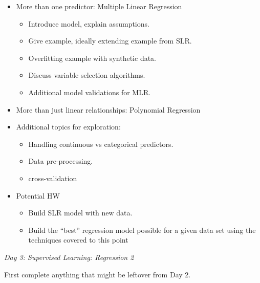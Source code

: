 \documentclass[12pt]{article}
\begin{document}
	\begin{itemize}
		\item More than one predictor: Multiple Linear Regression
		\begin{itemize}
			\item Introduce model, explain assumptions.
			\item Give example, ideally extending example from SLR.
			\item Overfitting example with synthetic data.
			\item Discuss variable selection algorithms.
			\item Additional model validations for MLR.
		\end{itemize}
		\item More than just linear relationships: Polynomial Regression
		\item Additional topics for exploration:
		\begin{itemize}
			\item Handling continuous vs categorical predictors.
			\item Data pre-processing.
			\item cross-validation
		\end{itemize}
		\item Potential HW
		\begin{itemize}
			\item Build SLR model with new data.
			\item Build the ``best'' regression model possible for a given data set using the techniques covered to this point
		\end{itemize}
	\end{itemize}
	
	
	\vspace{2mm}
	\noindent
	\textit{\large{Day 3: Supervised Learning: Regression 2}}
	
	\noindent
	First complete anything that might be leftover from Day 2.
	
\end{document}
